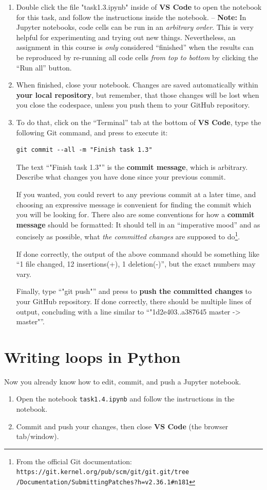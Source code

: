 \documentclass[12pt,a4paper]{article}
\begin{document}
\begin{enumerate}
\item Double click the file "task1.3.ipynb" inside of \textbf{VS Code} to open the notebook for this task, and follow the instructions inside the notebook. -- \textbf{Note:} In Jupyter notebooks, code cells can be run in an \emph{arbitrary order}. This is very helpful for experimenting and trying out new things. Nevertheless, an assignment in this course is \emph{only} considered ``finished'' when the results can be reproduced by re-running all code cells \emph{from top to bottom} by clicking the ``Run all'' button.
\item When finished, close your notebook. Changes are saved automatically within \textbf{your local repository}, but remember, that those changes will be lost when you close the codespace, unless you push them to your GitHub repository.
\item To do that, click on the ``Terminal'' tab at the bottom of \textbf{VS Code}, type the following Git command, and press \Return to execute it:
\begin{Verbatim}[frame=single]
git commit --all -m "Finish task 1.3"
\end{Verbatim}
The text ``"Finish task 1.3"'' is the \textbf{commit message}, which is arbitrary. Describe what changes you have done since your previous commit.

If you wanted, you could revert to any previous commit at a later time, and choosing an expressive message is convenient for finding the commit which you will be looking for. There also are some conventions for how a \textbf{commit message} should be formatted: It should tell in an ``imperative mood'' and as concisely as possible, what \emph{the committed changes} are supposed to do\footnote{From the official Git documentation: \texttt{https://git.kernel.org/pub/scm/git/git.git/tree\\/Documentation/SubmittingPatches?h=v2.36.1\#n181}}.

If done correctly, the output of the above command should be something like ``1 file changed, 12 insertions(+), 1 deletion(-)'', but the exact numbers may vary.

Finally, type ``"git push"'' and press \Return to \textbf{push the committed changes} to your GitHub repository. If done correctly, there should be multiple lines of output, concluding with a line similar to ``"1d2e403..a387645 master -> master"''.
\end{enumerate}

\section{Writing loops in Python}
Now you already know how to edit, commit, and push a Jupyter notebook.
\begin{enumerate}
    \item Open the notebook \texttt{task1.4.ipynb} and follow the instructions in the notebook.
    \item Commit and push your changes, then close \textbf{VS Code} (the browser tab/window).
\end{enumerate}
\end{document}
